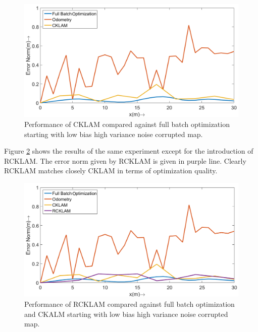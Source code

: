   
\begin{figure}
  \centering
    \includegraphics[width=1.00\textwidth]{images/Syn31_error_plot_CKLAM.png}
  \caption{Performance of CKLAM compared against full batch optimization starting with low bias high variance noise corrupted map.}
  \label{fig:Syn31ErrorPlotCKLAM}
\end{figure}
  
  
  Figure \ref{fig:Syn31ErrorPlot} shows the results of the same experiment except for the introduction of RCKLAM. The error norm given by RCKLAM is given in purple line. Clearly RCKLAM matches closely CKLAM in terms of optimization quality.
    
  \begin{figure}
    \centering
      \includegraphics[width=1.00\textwidth]{images/Syn31_error_plot.png}
    \caption{Performance of RCKLAM compared against full batch optimization and CKALM starting with low bias high variance noise corrupted map.}
    \label{fig:Syn31ErrorPlot}
  \end{figure}
  
